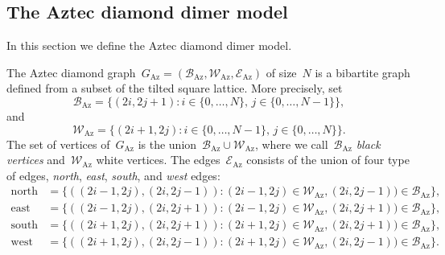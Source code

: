 \documentclass[11pt]{article}
\theoremstyle{plain}
\theoremstyle{definition}
\numberwithin{equation}{section}
\begin{document}
\subsection{The Aztec diamond dimer model}
In this section we define the Aztec diamond dimer model.

The Aztec diamond graph~$G_\text{Az}=(\mathcal B_\text{Az}, \mathcal W_\text{Az}, \mathcal E_\text{Az})$ of size~$N$ is a bibartite graph defined from a subset of the tilted square lattice. More precisely, set
\begin{equation}
\mathcal B_\text{Az}=\{(2i,2j+1): i\in \{0,\dots,N\}, \, j\in\{0,\dots,N-1\}\}, 
\end{equation}
and 
\begin{equation}
\mathcal W_\text{Az}=\{(2i+1,2j): i\in \{0,\dots,N-1\}, \, j\in\{0,\dots,N\}\}.
\end{equation}
The set of vertices of~$G_\text{Az}$ is the union~$\mathcal B_\text{Az}\cup \mathcal W_\text{Az}$, where we call~$\mathcal B_\text{Az}$ \emph{black vertices} and~$\mathcal W_\text{Az}$ white vertices. The edges~$\mathcal E_\text{Az}$ consists of the union of four type of edges,  \emph{north}, \emph{east}, \emph{south}, and \emph{west} edges:
\begin{align*}
\text{north}& =\{((2i-1,2j),(2i,2j-1)):(2i-1,2j)\in \mathcal W_{\text{Az}},(2i,2j-1))\in \mathcal B_{\text{Az}}\}, \\
\text{east}& =\{((2i-1,2j),(2i,2j+1)):(2i-1,2j)\in \mathcal W_{\text{Az}},(2i,2j+1))\in \mathcal B_{\text{Az}}\}, \\
\text{south}& =\{((2i+1,2j),(2i,2j+1)):(2i+1,2j)\in \mathcal W_{\text{Az}},(2i,2j+1))\in \mathcal B_{\text{Az}}\}, \\
\text{west}& =\{((2i+1,2j),(2i,2j-1)):(2i+1,2j)\in \mathcal W_{\text{Az}},(2i,2j-1))\in \mathcal B_{\text{Az}}\}.
\end{align*} 
\end{document}
